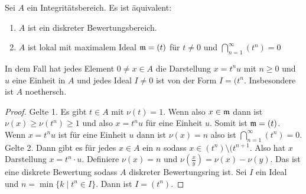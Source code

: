 \begin{Satz}\label{Satz:DBRIntersect} Sei \(A\) ein Integritätsbereich. Es ist äquivalent:
	\begin{enumerate}
		\item \(A\) ist ein diskreter Bewertungsbereich.
		\item \(A\) ist lokal mit maximalem Ideal \(\mathfrak{m}=(t)\) für \(t\neq 0\) und \(\bigcap_{n=1}^\infty (t^n)=0\)
	\end{enumerate}
	In dem Fall hat jedes Element \(0\neq x\in A\) die Darstellung \(x=t^nu\) mit \(n\geq 0\) und \(u\) eine Einheit in \(A\) und jedes Ideal
	\(I\neq 0\) ist von der Form \(I=(t^n\). Insbesondere ist \(A\) noethersch.
\end{Satz}
\begin{proof}
	Gelte 1. Es gibt \(t\in A\) mit \(\nu(t)=1\). Wenn also \(x\in\mathfrak{m}\) dann ist \(\nu(x)\geq \nu(t^n)\geq 1\) und also \(x=t^nu\) für
	eine Einheit \(u\). Somit ist \(\mathfrak{m}=(t)\). Wenn \(x=t^nu\) ist für eine Einheit \(u\) dann ist \(\nu(x)=n\) also ist \(\bigcap_{n=1}^\infty(t^n)=0\).
	Gelte 2. Dann gibt es für jedes \(x\in A\) ein \(n\) sodass \(x\in (t^n)\setminus(t^{n+1}\). Also hat \(x\) Darstellung \(x=t^n\cdot u\).
	Definiere \(\nu(x)=n\) und \(\nu(\frac x y)=\nu(x)-\nu(y)\). Das ist eine diskrete Bewertung sodass \(A\) diskreter Bewertungsring ist.
	Sei \(I\) ein Ideal und \(n=\min\{k\mid t^n\in I\}\). Dann ist \(I=(t^n)\).
\end{proof}


